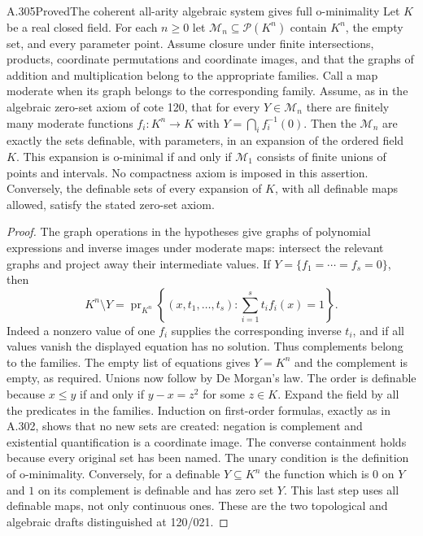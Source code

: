 \begin{saresult}{A.305}{Proved}{The coherent all-arity algebraic system gives full o-minimality}
Let $K$ be a real closed field. For each $n\geq0$ let
$\mathcal M_n\subseteq\mathcal P(K^n)$ contain $K^n$, the empty set,
and every parameter point. Assume closure under finite intersections,
products, coordinate permutations and coordinate images, and that the
graphs of addition and multiplication belong to the appropriate families.
Call a map moderate when its graph belongs to the corresponding family.
Assume, as in the algebraic zero-set axiom of cote 120, that for every
$Y\in\mathcal M_n$ there are finitely many moderate functions
$f_i:K^n\to K$ with $Y=\bigcap_i f_i^{-1}(0)$.
Then the $\mathcal M_n$ are exactly the sets definable, with parameters,
in an expansion of the ordered field $K$. This expansion is o-minimal
if and only if $\mathcal M_1$ consists of finite unions of points and
intervals. No compactness axiom is imposed in this assertion.
Conversely, the definable sets of every expansion of $K$, with all
definable maps allowed, satisfy the stated zero-set axiom.
\end{saresult}
\begin{proof}
The graph operations in the hypotheses give graphs of polynomial
expressions and inverse images under moderate maps: intersect the
relevant graphs and project away their intermediate values. If
$Y=\{f_1=\cdots=f_s=0\}$, then
\[
 K^n\setminus Y
 =\operatorname{pr}_{K^n}
 \left\{(x,t_1,\ldots,t_s):\sum_{i=1}^s t_i f_i(x)=1\right\}.
\]
Indeed a nonzero value of one $f_i$ supplies the corresponding inverse
$t_i$, and if all values vanish the displayed equation has no solution.
Thus complements belong to the families. The empty list of equations
gives $Y=K^n$ and the complement is empty, as required. Unions now follow
by De Morgan's law. The order is definable because
$x\leq y$ if and only if $y-x=z^2$ for some $z\in K$.
Expand the field by all the predicates in the families. Induction on
first-order formulas, exactly as in A.302, shows that no new sets are
created: negation is complement and existential quantification is a
coordinate image. The converse containment holds because every original
set has been named. The unary condition is the definition of
o-minimality. Conversely, for a definable $Y\subseteq K^n$ the function
which is $0$ on $Y$ and $1$ on its complement is definable and has zero
set $Y$. This last step uses all definable maps, not only continuous
ones. These are the two topological and algebraic drafts distinguished
at 120/021.
\end{proof}

